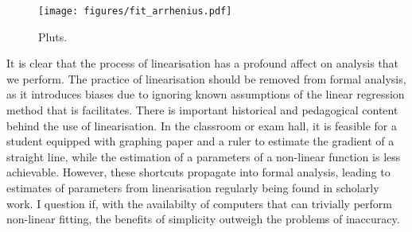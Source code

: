 \documentclass[reprint,superscriptaddress,nobibnotes,amsmath,amssymb]{revtex4-2}
\begin{document}
%
\begin{figure}
  \texttt{[image: figures/fit\_arrhenius.pdf]}
  \caption{
    Pluts.
    }
  \label{fig:fit_arrhenius}
\end{figure}
%

It is clear that the process of linearisation has a profound affect on analysis that we perform. 
The practice of linearisation should be removed from formal analysis, as it introduces biases due to ignoring known assumptions of the linear regression method that is facilitates. 
There is important historical and pedagogical content behind the use of linearisation. 
In the classroom or exam hall, it is feasible for a student equipped with graphing paper and a ruler to estimate the gradient of a straight line, while the estimation of a parameters of a non-linear function is less achievable. 
However, these shortcuts propagate into formal analysis, leading to estimates of parameters from linearisation regularly being found in scholarly work. 
I question if, with the availabilty of computers that can trivially perform non-linear fitting, the benefits of simplicity outweigh the problems of inaccuracy.



\end{document}
